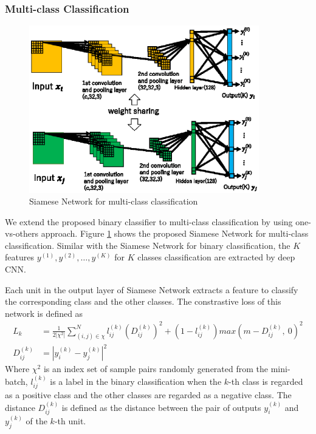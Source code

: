 \documentclass[a4paper,12pt]{article}
\begin{document}
\subsubsection{Multi-class Classification}
\begin{figure}[ht]
\begin{center}
\includegraphics[width=100mm]{figure3.eps}
\caption{Siamese Network for multi-class classification}
\label{fig:siamese-mu}
\end{center}
\end{figure}
We extend the proposed binary classifier to multi-class classification by using one-vs-others approach.
Figure \ref{fig:siamese-mu} shows the proposed Siamese Network for multi-class classification.
Similar with the Siamese Network for binary classification, the $K$ features $y^{(1)},y^{(2)},\ldots,y^{(K)}$ for $K$ classes classification are extracted by deep CNN.

Each unit in the output layer of Siamese Network extracts a feature to classify the corresponding class and the other classes.
The constrastive loss of this network is defined as
\begin{align} \label{eq:multi contrastive}
L_k&=\frac{1}{2|\chi^2|}\sum_{(i,j) \in \chi}^N l_{ij}^{(k)}(D^{(k)}_{ij})^2 + (1-l_{ij}^{(k)})max(m-D^{(k)}_{ij}, ~0)^2 \\
D^{(k)}_{ij}&=|y^{(k)}_{i}- y^{(k)}_{j}|^2
\end{align}
Where $\chi^2$ is an index set of sample pairs randomly generated from the mini-batch, $l^{(k)}_{ij}$ is a label in the binary classification when the $k$-th class is regarded as a positive class and the other classes are regarded as a negative class.
The distance $D^{(k)}_{ij}$ is defined as the distance between the pair of outputs $y_i^{(k)}$ and $y_j^{(k)}$ of the $k$-th unit.
\end{document}
